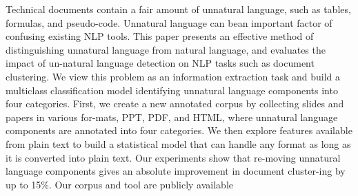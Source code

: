 Technical documents contain a fair amount of unnatural language, such as tables, formulas, and pseudo-code. Unnatural language can bean important factor of confusing existing NLP tools. This paper presents an effective method of distinguishing unnatural language from natural language, and evaluates the impact of un-natural language detection on NLP tasks such as document clustering.  We view this problem as an information extraction task and build a multiclass classification model identifying unnatural language components into four categories. First, we create a new annotated corpus by collecting slides and papers in various for-mats, PPT, PDF, and HTML, where unnatural language components are annotated into four categories. We then explore features available from plain text to build a statistical model that can handle any format as long as it is converted into plain text. Our experiments show that re-moving unnatural language components gives an absolute improvement in document cluster-ing by up to 15\%.   Our corpus and tool are publicly available
